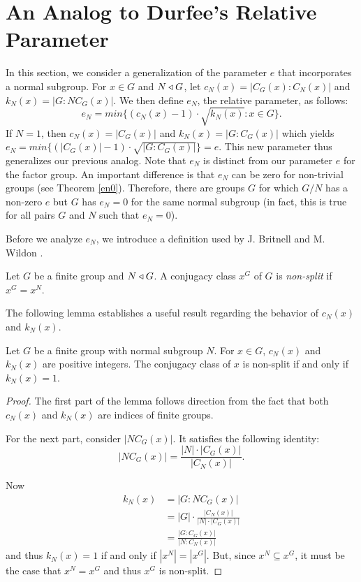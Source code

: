 \documentclass[main.tex]{subfiles}
\begin{document}
\chapter{An Analog to Durfee's Relative Parameter}

In this section, we consider a generalization of the parameter $e$ that incorporates a normal subgroup. For $x \in G$ and $N \triangleleft G$, let $c_N(x) = |C_G(x):C_N(x)|$ and $k_N(x) = |G:NC_G(x)|$. We then define $e_N$, the relative parameter, as follows:
$$e_N = min\{(c_N(x) - 1) \cdot \sqrt{k_N(x)} : x \in G\}\text{.}$$
If $N=1$, then $c_N(x) = |C_G(x)|$ and $k_N(x) = |G:C_G(x)|$ which yields $e_N = min\{(|C_G(x)| - 1)\cdot\sqrt{|G:C_G(x)|}\} = e$. This new parameter thus generalizes our previous analog. Note that $e_N$ is distinct from our parameter $e$ for the factor group. An important difference is that $e_N$ can be zero for non-trivial groups (see Theorem \ref{en0}). Therefore, there are groups $G$ for which $G/N$ has a non-zero $e$ but $G$ has $e_N = 0$ for the same normal subgroup (in fact, this is true for all pairs $G$ and $N$ such that $e_N = 0$).



 Before we analyze $e_N$, we introduce a definition used by J. Britnell and M. Wildon \cite{britnellwildonarticle}.

\hss

\begin{definition}
Let $G$ be a finite group and $N \triangleleft G$. A conjugacy class $x^G$ of $G$ is \emph{non-split} \cite{britnellwildonarticle} if $x^G = x^N$.
\end{definition}

\hss

The following lemma establishes a useful result regarding the behavior of $c_N(x)$ and $k_N(x)$.

\begin{lemma}\label{kn1}
Let $G$ be a finite group with normal subgroup $N$. For $x \in G$, $c_N(x)$ and $k_N(x)$ are positive integers. The conjugacy class of $x$ is non-split if and only if $k_N(x) = 1$.
\end{lemma}

\begin{proof}
The first part of the lemma follows direction from the fact that both $c_N(x)$ and $k_N(x)$ are indices of finite groups.

For the next part, consider $|NC_G(x)|$. It satisfies the following identity:
$$|NC_G(x)| = \frac{|N| \cdot |C_G(x)|}{|C_N(x)|}\text{.}$$

Now
\begin{align*}
k_N(x) &= |G : NC_G(x)| \\
&= |G| \cdot \frac{|C_N(x)|}{|N| \cdot |C_G(x)|} \\
&= \frac{|G : C_G(x)|}{|N : C_N(x)|}
\end{align*}
and thus $k_N(x) = 1$ if and only if $|x^N| = |x^G|$. But, since $x^N \subseteq x^G$, it must be the case that $x^N = x^G$ and thus $x^G$ is non-split.
\end{proof}
\end{document}
